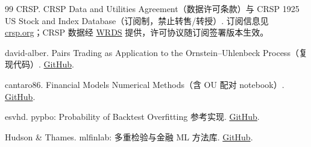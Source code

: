 \begin{thebibliography}{99}
 CRSP. CRSP Data and Utilities Agreement（数据许可条款）与 CRSP 1925 US Stock and Index Database（订阅制，禁止转售/转授）. 订阅信息见 \href{https://www.crsp.org}{crsp.org}；CRSP 数据经 \href{https://wrds-www.wharton.upenn.edu/documents/1145/CRSP-Data-on-WRDS.pdf}{WRDS} 提供，许可协议随订阅签署版本生效。

 david-alber. Pairs Trading as Application to the Ornstein--Uhlenbeck Process（复现代码）. \href{https://github.com/david-alber/Pairs-Trading-as-application-to-the-Ornstein-Uhlenbeck-Process}{GitHub}.

 cantaro86. Financial Models Numerical Methods（含 OU 配对 notebook）. \href{https://github.com/cantaro86/Financial-Models-Numerical-Methods}{GitHub}.

 esvhd. pypbo: Probability of Backtest Overfitting 参考实现. \href{https://github.com/esvhd/pypbo}{GitHub}.

 Hudson \& Thames. mlfinlab: 多重检验与金融 ML 方法库. \href{https://github.com/hudson-and-thames/mlfinlab}{GitHub}.

\end{thebibliography}
